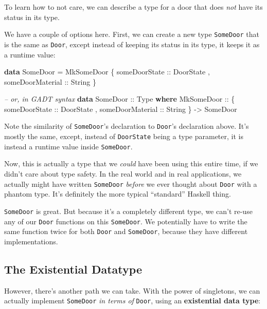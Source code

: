 \documentclass[]{article}
\newenvironment{Shaded}{}{}
\newcommand{\KeywordTok}[1]{\textcolor[rgb]{0.00,0.44,0.13}{\textbf{#1}}}
\newcommand{\DataTypeTok}[1]{\textcolor[rgb]{0.56,0.13,0.00}{#1}}
\newcommand{\CommentTok}[1]{\textcolor[rgb]{0.38,0.63,0.69}{\textit{#1}}}
\newcommand{\OtherTok}[1]{\textcolor[rgb]{0.00,0.44,0.13}{#1}}
\newcommand{\FunctionTok}[1]{\textcolor[rgb]{0.02,0.16,0.49}{#1}}
\newcommand{\NormalTok}[1]{#1}
\begin{document}
To learn how to not care, we can describe a type for a door that does \emph{not}
have its status in its type.

We have a couple of options here. First, we can create a new type
\texttt{SomeDoor} that is the same as \texttt{Door}, except instead of keeping
its status in its type, it keeps it as a runtime value:

\begin{Shaded}
\begin{Highlighting}[]
\KeywordTok{data} \DataTypeTok{SomeDoor} \FunctionTok{=} \DataTypeTok{MkSomeDoor}
\NormalTok{    \{}\OtherTok{ someDoorState    ::} \DataTypeTok{DoorState}
\NormalTok{    ,}\OtherTok{ someDoorMaterial ::} \DataTypeTok{String}
\NormalTok{    \}}

\CommentTok{-- or, in GADT syntax}
\KeywordTok{data} \DataTypeTok{SomeDoor}\OtherTok{ ::} \DataTypeTok{Type} \KeywordTok{where}
    \DataTypeTok{MkSomeDoor} \OtherTok{::}
\NormalTok{      \{}\OtherTok{ someDoorState    ::} \DataTypeTok{DoorState}
\NormalTok{      ,}\OtherTok{ someDoorMaterial ::} \DataTypeTok{String}
\NormalTok{      \} }\OtherTok{->} \DataTypeTok{SomeDoor}
\end{Highlighting}
\end{Shaded}

Note the similarity of \texttt{SomeDoor}'s declaration to \texttt{Door}'s
declaration above. It's mostly the same, except, instead of \texttt{DoorState}
being a type parameter, it is instead a runtime value inside \texttt{SomeDoor}.

Now, this is actually a type that we \emph{could} have been using this entire
time, if we didn't care about type safety. In the real world and in real
applications, we actually might have written \texttt{SomeDoor} \emph{before} we
ever thought about \texttt{Door} with a phantom type. It's definitely the more
typical ``standard'' Haskell thing.

\texttt{SomeDoor} is great. But because it's a completely different type, we
can't re-use any of our \texttt{Door} functions on this \texttt{SomeDoor}. We
potentially have to write the same function twice for both \texttt{Door} and
\texttt{SomeDoor}, because they have different implementations.

\subsection{The Existential Datatype}\label{the-existential-datatype}

However, there's another path we can take. With the power of singletons, we can
actually implement \texttt{SomeDoor} \emph{in terms of} \texttt{Door}, using an
\textbf{existential data type}:
\end{document}
